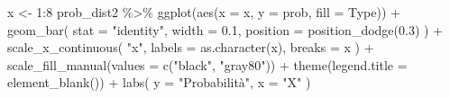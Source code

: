 \documentclass[
  10pt,
  italian,
  a4paper,
  extrafontsizes,onecolumn,openright
  ]{memoir}
\newenvironment{Shaded}{\begin{snugshade}}{\end{snugshade}}
\newcommand{\AttributeTok}[1]{\textcolor[rgb]{0.77,0.63,0.00}{#1}}
\newcommand{\DecValTok}[1]{\textcolor[rgb]{0.00,0.00,0.81}{#1}}
\newcommand{\FloatTok}[1]{\textcolor[rgb]{0.00,0.00,0.81}{#1}}
\newcommand{\FunctionTok}[1]{\textcolor[rgb]{0.00,0.00,0.00}{#1}}
\newcommand{\NormalTok}[1]{#1}
\newcommand{\OtherTok}[1]{\textcolor[rgb]{0.56,0.35,0.01}{#1}}
\newcommand{\SpecialCharTok}[1]{\textcolor[rgb]{0.00,0.00,0.00}{#1}}
\newcommand{\StringTok}[1]{\textcolor[rgb]{0.31,0.60,0.02}{#1}}
\begin{document}
\begin{Shaded}
\end{Shaded}

\begin{Shaded}
\begin{Highlighting}[]
\NormalTok{x }\OtherTok{\textless{}{-}} \DecValTok{1}\SpecialCharTok{:}\DecValTok{8}
\NormalTok{prob\_dist2 }\SpecialCharTok{\%\textgreater{}\%}
  \FunctionTok{ggplot}\NormalTok{(}\FunctionTok{aes}\NormalTok{(}\AttributeTok{x =}\NormalTok{ x, }\AttributeTok{y =}\NormalTok{ prob, }\AttributeTok{fill =}\NormalTok{ Type)) }\SpecialCharTok{+}
  \FunctionTok{geom\_bar}\NormalTok{(}
    \AttributeTok{stat =} \StringTok{"identity"}\NormalTok{, }
    \AttributeTok{width =} \FloatTok{0.1}\NormalTok{, }
    \AttributeTok{position =} \FunctionTok{position\_dodge}\NormalTok{(}\FloatTok{0.3}\NormalTok{)}
\NormalTok{  ) }\SpecialCharTok{+}
  \FunctionTok{scale\_x\_continuous}\NormalTok{(}
    \StringTok{"x"}\NormalTok{, }
    \AttributeTok{labels =} \FunctionTok{as.character}\NormalTok{(x), }
    \AttributeTok{breaks =}\NormalTok{ x}
\NormalTok{  ) }\SpecialCharTok{+}
  \FunctionTok{scale\_fill\_manual}\NormalTok{(}\AttributeTok{values =} \FunctionTok{c}\NormalTok{(}\StringTok{"black"}\NormalTok{, }\StringTok{"gray80"}\NormalTok{)) }\SpecialCharTok{+}
  \FunctionTok{theme}\NormalTok{(}\AttributeTok{legend.title =} \FunctionTok{element\_blank}\NormalTok{()) }\SpecialCharTok{+}
  \FunctionTok{labs}\NormalTok{(}
    \AttributeTok{y =} \StringTok{"Probabilità"}\NormalTok{,}
    \AttributeTok{x =} \StringTok{"X"}
\NormalTok{  )}
\end{Highlighting}
\end{Shaded}
\end{document}
